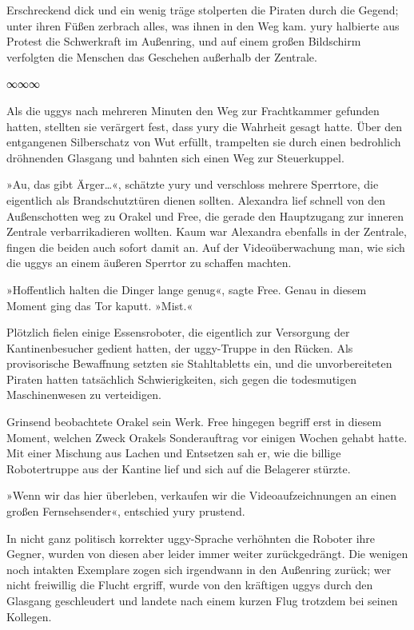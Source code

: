Erschreckend dick und ein wenig träge stolperten die Piraten durch die Gegend; unter ihren Füßen zerbrach alles, was ihnen in den Weg kam. yury halbierte aus Protest die Schwerkraft im Außenring, und auf einem großen Bildschirm verfolgten die Menschen das Geschehen außerhalb der Zentrale.

\begin{center}
    ∞∞∞
\end{center}

Als die uggys nach mehreren Minuten den Weg zur Frachtkammer gefunden hatten, stellten sie verärgert fest, dass yury die Wahrheit gesagt hatte. Über den entgangenen Silberschatz von Wut erfüllt, trampelten sie durch einen bedrohlich dröhnenden Glasgang und bahnten sich einen Weg zur Steuerkuppel.

»Au, das gibt Ärger…«, schätzte yury und verschloss mehrere Sperrtore, die eigentlich als Brandschutztüren dienen sollten. Alexandra lief schnell von den Außenschotten weg zu Orakel und Free, die gerade den Hauptzugang zur inneren Zentrale verbarrikadieren wollten. Kaum war Alexandra ebenfalls in der Zentrale, fingen die beiden auch sofort damit an. Auf der Videoüberwachung man, wie sich die uggys an einem äußeren Sperrtor zu schaffen machten.

»Hoffentlich halten die Dinger lange genug«, sagte Free. Genau in diesem Moment ging das Tor kaputt. »Mist.«

Plötzlich fielen einige Essensroboter, die eigentlich zur Versorgung der Kantinenbesucher gedient hatten, der uggy-Truppe in den Rücken. Als provisorische Bewaffnung setzten sie Stahltabletts ein, und die unvorbereiteten Piraten hatten tatsächlich Schwierigkeiten, sich gegen die todesmutigen Maschinenwesen zu verteidigen.

Grinsend beobachtete Orakel sein Werk. Free hingegen begriff erst in diesem Moment, welchen Zweck Orakels Sonderauftrag vor einigen Wochen gehabt hatte. Mit einer Mischung aus Lachen und Entsetzen sah er, wie die billige Robotertruppe aus der Kantine lief und sich auf die Belagerer stürzte.

»Wenn wir das hier überleben, verkaufen wir die Videoaufzeichnungen an einen großen Fernsehsender«, entschied yury prustend.

In nicht ganz politisch korrekter uggy-Sprache verhöhnten die Roboter ihre Gegner, wurden von diesen aber leider immer weiter zurückgedrängt. Die wenigen noch intakten Exemplare zogen sich irgendwann in den Außenring zurück; wer nicht freiwillig die Flucht ergriff, wurde von den kräftigen uggys durch den Glasgang geschleudert und landete nach einem kurzen Flug trotzdem bei seinen Kollegen.

